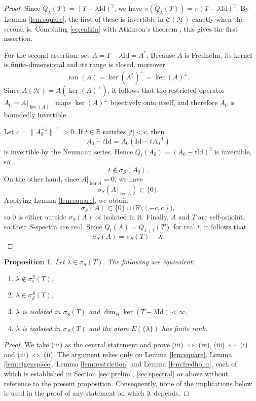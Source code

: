 \documentclass[12pt,a4paper]{article}
\theoremstyle{plain}
\newtheorem{proposition}[theorem]{Proposition}
\theoremstyle{definition}
\theoremstyle{remark}
\newcommand{\HH}{\mathbb H}
\newcommand{\RR}{\mathbb R}
\newcommand{\Calk}{\mathcal C}
\newcommand{\Id}{\mathrm{Id}}
\newcommand{\HS}{\mathcal H}
\newcommand{\dimH}{\dim_{\HH}}
\newcommand{\sigS}{\sigma_S}
\newcommand{\sigeS}{\sigma_{e}^{S}}
\newcommand{\sigdS}{\sigma_{d}^{S}}
\DeclareMathOperator{\ran}{ran}
\begin{document}
{\begin{proof}
Since \(Q_\lambda(T)=(T-\lambda\Id)^2\), we have
\(\pi(Q_\lambda(T))=\pi(T-\lambda\Id)^2\). By Lemma \ref{lem:square},
the first of these is invertible in \(\Calk(\HS)\) exactly when the
second is. Combining \eqref{eq:calkin} with Atkinson's theorem
\cite{MuraleetharanThirulogasanthar2018}, this gives the first
assertion.

For the second assertion, set \(A=T-\lambda\Id=A^*\). Because \(A\) is
Fredholm, its kernel is finite-dimensional and its range is closed,
moreover
$$\ran(A)=\ker(A^*)^\perp=\ker(A)^\perp.$$ Since
\(A(\HS)=A(\ker(A)^\perp)\), it follows that the restricted operator
\(A_0=A|_{\ker(A)^\perp}\) maps \(\ker(A)^\perp\) bijectively onto
itself, and therefore \(A_0\) is boundedly invertible.

Let \(c=\|A_0^{-1}\|^{-1}>0\). If \(t\in\RR\) satisfies \(|t|<c\), then
$$A_0-t\Id=A_0(\Id-tA_0^{-1})$$ is invertible by the Neumann series.
Hence \(Q_t(A_0)=(A_0-t\Id)^2\) is invertible, so
$$t\notin\sigS(A_0).$$ On the other hand, since \(A|_{\ker A}=0\), we
have $$\sigS(A|_{\ker A})\subset\{0\}.$$ Applying Lemma
\ref{lem:square}, we obtain
\[
\sigS(A)\subset\{0\}\cup\bigl(\RR\setminus(-c,c)\bigr),
\]
so \(0\) is either outside \(\sigS(A)\) or isolated in it. Finally, \(A\) and \(T\) are self-adjoint, so their \(S\)-spectra are
real. Since \(Q_t(A)=Q_{\lambda+t}(T)\) for real \(t\), it follows
that $$\sigS(A)=\sigS(T)-\lambda.$$
\end{proof}

\begin{proposition}
\label{prop:criterion}
Let $\lambda\in\sigS(T)$. The following are equivalent:
\begin{enumerate}[label=(\roman*),leftmargin=2.4em]
\item $\lambda\notin\sigeS(T)$,
\item $\lambda\in\sigdS(T)$,
\item $\lambda$ is isolated in $\sigS(T)$ and
$\dimH\ker(T-\lambda\Id)<\infty$,
\item $\lambda$ is isolated in $\sigS(T)$ and the atom
$E(\{\lambda\})$ has finite rank.
\end{enumerate}
\end{proposition}

\begin{proof}
We take (iii) as the central statement and prove
(iii) $\Leftrightarrow$ (iv), (iii) $\Leftrightarrow$ (i) and
(iii) $\Leftrightarrow$ (ii). The argument relies only on Lemma
\ref{lem:square}, Lemma \ref{lem:eigenspace}, Lemma
\ref{lem:restriction} and Lemma \ref{lem:fredholm}, each of which is
established in Section \ref{sec:prelim}, \ref{sec:spectral} or above
without reference to the present proposition. Consequently, none of
the implications below is used in the proof of any statement on which
it depends.


\end{proof}}
\end{document}
